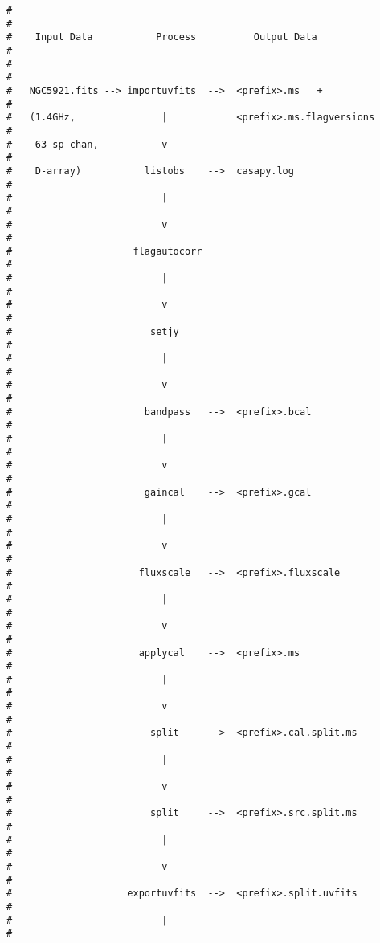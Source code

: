 \begin{verbatim}
#                                                                        #
#    Input Data           Process          Output Data                   #
#                                                                        #
#   NGC5921.fits --> importuvfits  -->  <prefix>.ms   +                  #
#   (1.4GHz,               |            <prefix>.ms.flagversions         #
#    63 sp chan,           v                                             #
#    D-array)           listobs    -->  casapy.log                       #
#                          |                                             #
#                          v                                             #
#                     flagautocorr                                       #
#                          |                                             #
#                          v                                             #
#                        setjy                                           #
#                          |                                             #
#                          v                                             #
#                       bandpass   -->  <prefix>.bcal                    #
#                          |                                             #
#                          v                                             #
#                       gaincal    -->  <prefix>.gcal                    #
#                          |                                             #
#                          v                                             #
#                      fluxscale   -->  <prefix>.fluxscale               #
#                          |                                             #
#                          v                                             #
#                      applycal    -->  <prefix>.ms                      #
#                          |                                             #
#                          v                                             #
#                        split     -->  <prefix>.cal.split.ms            #
#                          |                                             #
#                          v                                             #
#                        split     -->  <prefix>.src.split.ms            #
#                          |                                             #
#                          v                                             #
#                    exportuvfits  -->  <prefix>.split.uvfits            #
#                          |                                             #

\end{verbatim}
